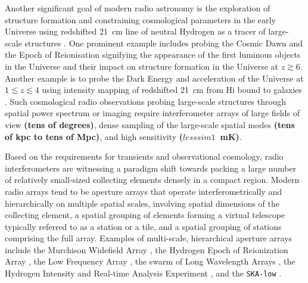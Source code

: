 \documentclass[
  journal=pasa,
  manuscript=article-type,
  year=2020,
  volume=37,
]{cup-journal}
\begin{document}
Another significant goal of modern radio astronomy is the exploration of structure formation and constraining cosmological parameters in the early Universe using redshifted 21~cm line of neutral Hydrogen as a tracer of large-scale structures \citep[][and references therein]{Morales+2010,Pritchard+2012}. One prominent example includes probing the Cosmic Dawn and the Epoch of Reionisation signifying the appearance of the first luminous objects in the Universe and their impact on structure formation in the Universe at $z\gtrsim 6$. Another example is to probe the Dark Energy and acceleration of the Universe at $1\lesssim z\lesssim 4$ using intensity mapping of redshifted 21~cm from H{\sc i} bound to galaxies \citep{CosmicVisions+2018}. Such cosmological radio observations probing large-scale structures through spatial power spectrum or imaging require interferometer arrays of large fields of view \textbf{(tens of degrees)}, dense sampling of the large-scale spatial modes \textbf{(tens of kpc to tens of Mpc)}, and high sensitivity \textbf{($lesssim 1$~mK)}. 

Based on the requirements for transients and observational cosmology, radio interferometers are witnessing a paradigm shift towards packing a large number of relatively small-sized collecting elements densely in a compact region. Modern radio arrays tend to be aperture arrays that operate interferometrically and hierarchically on multiple spatial scales, involving spatial dimensions of the collecting element, a spatial grouping of elements forming a virtual telescope typically referred to as a station or a tile, and a spatial grouping of stations comprising the full array.
Examples of multi-scale, hierarchical aperture arrays include the Murchison Widefield Array \cite[MWA;][]{Tingay+2013}, the Hydrogen Epoch of Reionization Array \citep[HERA;][]{HERA+2017}, the Low Frequency Array \cite[LOFAR;][]{vanHaarlem+2013}, the swarm of Long Wavelength Arrays \cite[LWA Swarm;][]{Dowell+2018}, 
the Hydrogen Intensity and Real-time Analysis Experiment \citep[HIRAX;][]{HIRAX+2022}, and the \texttt{SKA-low} \cite{Dewdney+2009,SKA1+2019}. 
\end{document}
